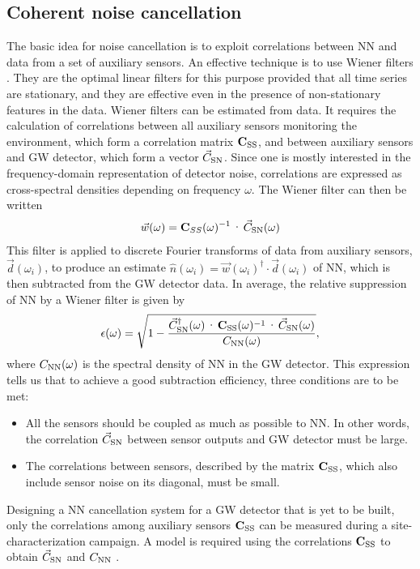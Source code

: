 \subsection{Coherent noise cancellation}
\label{sub:Wiener}
The basic idea for noise cancellation is to exploit correlations between NN and data from a set of auxiliary sensors. An effective technique is to use Wiener filters \cite{Orf2007}. They are the optimal linear filters for this purpose provided that all time series are stationary, and they are effective even in the presence of non-stationary features in the data. Wiener filters can be estimated from data. It requires the calculation of correlations between all auxiliary sensors monitoring the environment, which form a correlation matrix $\mathbf C_{\rm SS}$, and between auxiliary sensors and GW detector, which form a vector $\vec C_{\rm SN}$. Since one is mostly interested in the frequency-domain representation of detector noise, correlations are expressed as cross-spectral densities depending on frequency $\omega$. The Wiener filter can then be written
\begin{eqnarray}
		\vec w(\omega)=\mathbf C_{SS}(\omega)^{-1}\cdot\vec C_{\rm SN}(\omega)
		\label{eq:Wiener}
\end{eqnarray}
This filter is applied to discrete Fourier transforms of data from auxiliary sensors, $\vec d(\omega_i)$, to produce an estimate $\hat n(\omega_i)=\vec w(\omega_i)^\dagger\cdot \vec d(\omega_i)$ of NN, which is then subtracted from the GW detector data. In average, the relative suppression of NN by a Wiener filter is given by
\begin{eqnarray}
		\epsilon(\omega)=\sqrt{1-\frac{\vec C^\dagger_{\rm SN}(\omega)\cdot \mathbf C_{\rm SS}(\omega)^{-1}\cdot\vec C_{\rm SN}(\omega)}{C_{\rm NN}(\omega)}},
		\label{eq:residual}
\end{eqnarray}
where $C_{\rm NN}(\omega)$ is the spectral density of NN in the GW detector. This expression tells us that to achieve a good subtraction efficiency, three conditions are to be met:
\begin{itemize}
\item All the sensors should be coupled as much as possible to NN. In other words, the correlation $\vec C_{\rm SN}$ between sensor outputs and GW detector must be large.
\item The correlations between sensors, described by the matrix $\mathbf C_{\rm SS}$, which also include sensor noise on its diagonal, must be small.
\end{itemize}
Designing a NN cancellation system for a GW detector that is yet to be built, only the correlations among auxiliary sensors $\mathbf C_{\rm SS}$ can be measured during a site-characterization campaign. A model is required using the correlations $\mathbf C_{\rm SS}$ to obtain $\vec C_{\rm SN}$ and $C_{\rm NN}$ \cite{CoEA2016a}.


